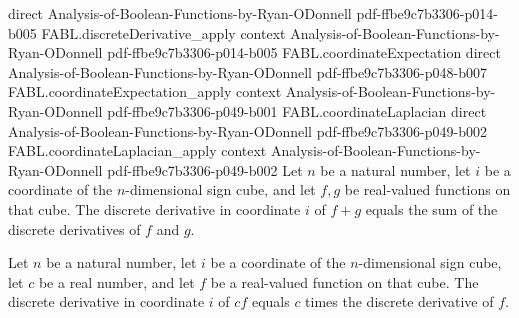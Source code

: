 \begin{theorem}
  {direct}
  {Analysis-of-Boolean-Functions-by-Ryan-ODonnell}
  {pdf-ffbe9c7b3306-p014-b005}
\proofstep
  {FABL.discreteDerivative_apply}
  {context}
  {Analysis-of-Boolean-Functions-by-Ryan-ODonnell}
  {pdf-ffbe9c7b3306-p014-b005}
\proofstep
  {FABL.coordinateExpectation}
  {direct}
  {Analysis-of-Boolean-Functions-by-Ryan-ODonnell}
  {pdf-ffbe9c7b3306-p048-b007}
\proofstep
  {FABL.coordinateExpectation_apply}
  {context}
  {Analysis-of-Boolean-Functions-by-Ryan-ODonnell}
  {pdf-ffbe9c7b3306-p049-b001}
\proofstep
  {FABL.coordinateLaplacian}
  {direct}
  {Analysis-of-Boolean-Functions-by-Ryan-ODonnell}
  {pdf-ffbe9c7b3306-p049-b002}
\proofstep
  {FABL.coordinateLaplacian_apply}
  {context}
  {Analysis-of-Boolean-Functions-by-Ryan-ODonnell}
  {pdf-ffbe9c7b3306-p049-b002}
Let $n$ be a natural number, let $i$ be a coordinate of the $n$-dimensional sign cube,
and let $f,g$ be real-valued functions on that cube. The discrete derivative in
coordinate $i$ of $f+g$ equals the sum of the discrete derivatives of $f$ and $g$.
\end{theorem}

\begin{theorem}
\label{FABL.discreteDerivative_smul}
\leanok
{}
Let $n$ be a natural number, let $i$ be a coordinate of the $n$-dimensional sign cube,
let $c$ be a real number, and let $f$ be a real-valued function on that cube. The
discrete derivative in coordinate $i$ of $c f$ equals $c$ times the discrete derivative
of $f$.
\end{theorem}

